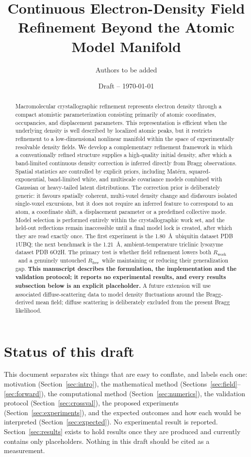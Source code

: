 \documentclass[11pt]{article}
\title{Continuous Electron-Density Field Refinement Beyond the Atomic Model Manifold}
\author{Authors to be added}
\date{Draft -- \today}
\newcommand{\Rwork}{\ensuremath{R_{\mathrm{work}}}}
\newcommand{\Rfree}{\ensuremath{R_{\mathrm{free}}}}
\begin{document}
\maketitle

\begin{abstract}
Macromolecular crystallographic refinement represents electron density through a compact atomistic parameterization consisting primarily of atomic coordinates, occupancies, and displacement parameters. This representation is efficient when the underlying density is well described by localized atomic peaks, but it restricts refinement to a low-dimensional nonlinear manifold within the space of experimentally resolvable density fields. We develop a complementary refinement framework in which a conventionally refined structure supplies a high-quality initial density, after which a band-limited continuous density correction is inferred directly from Bragg observations. Spatial statistics are controlled by explicit priors, including Mat\'ern, squared-exponential, band-limited white, and multiscale covariance models combined with Gaussian or heavy-tailed latent distributions. The correction prior is deliberately generic: it favours spatially coherent, multi-voxel density change and disfavours isolated single-voxel excursions, but it does not require an inferred feature to correspond to an atom, a coordinate shift, a displacement parameter or a predefined collective mode. Model selection is performed entirely within the crystallographic work set, and the held-out reflections remain inaccessible until a final model lock is created, after which they are read exactly once. The first experiment is the 1.80~\AA\ ubiquitin dataset PDB 1UBQ; the next benchmark is the 1.21~\AA, ambient-temperature triclinic lysozyme dataset PDB 6O2H. The primary test is whether field refinement lowers both \Rwork\ and a genuinely untouched \Rfree\ while maintaining or reducing their generalization gap. \textbf{This manuscript describes the formulation, the implementation and the validation protocol; it reports no experimental results, and every results subsection below is an explicit placeholder.} A future extension will use associated diffuse-scattering data to model density fluctuations around the Bragg-derived mean field; diffuse scattering is deliberately excluded from the present Bragg likelihood.
\end{abstract}

\section*{Status of this draft}
This document separates six things that are easy to conflate, and labels each one:
motivation (Section~\ref{sec:intro}), the mathematical method (Sections~\ref{sec:field}--\ref{sec:forward}),
the computational method (Section~\ref{sec:numerics}), the validation protocol
(Section~\ref{sec:crossval}), the proposed experiments (Section~\ref{sec:experiments}),
and the expected outcomes and how each would be interpreted (Section~\ref{sec:expected}).
No experimental result is reported. Section~\ref{sec:results} exists to hold results once
they are produced and currently contains only placeholders. Nothing in this draft should be
cited as a measurement.
\end{document}
